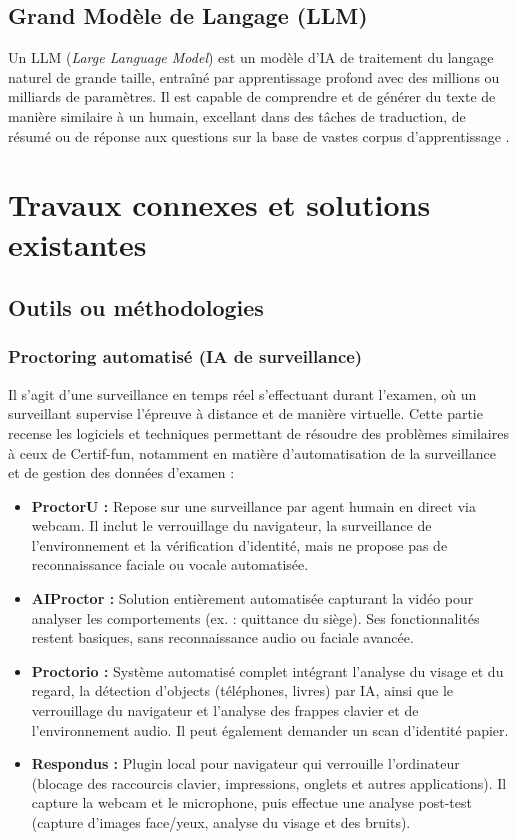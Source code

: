 \subsection{Grand Modèle de Langage (LLM)}
Un LLM (\textit{Large Language Model}) est un modèle d’IA de traitement du langage naturel de grande taille, entraîné par apprentissage profond avec des millions ou milliards de paramètres. Il est capable de comprendre et de générer du texte de manière similaire à un humain, excellant dans des tâches de traduction, de résumé ou de réponse aux questions sur la base de vastes corpus d'apprentissage \cite{topakkaya2024llm}.

\section{Travaux connexes et solutions existantes}
\subsection{Outils ou méthodologies}

\subsubsection{Proctoring automatisé (IA de surveillance)}
Il s'agit d'une surveillance en temps réel s'effectuant durant l'examen, où un surveillant supervise l'épreuve à distance et de manière virtuelle. Cette partie recense les logiciels et techniques permettant de résoudre des problèmes similaires à ceux de Certif-fun, notamment en matière d’automatisation de la surveillance et de gestion des données d’examen \cite{hussein2020evaluation} :

\begin{itemize}
    \item \textbf{ProctorU :} Repose sur une surveillance par agent humain en direct via webcam. Il inclut le verrouillage du navigateur, la surveillance de l’environnement et la vérification d’identité, mais ne propose pas de reconnaissance faciale ou vocale automatisée.
    \item \textbf{AIProctor :} Solution entièrement automatisée capturant la vidéo pour analyser les comportements (ex. : quittance du siège). Ses fonctionnalités restent basiques, sans reconnaissance audio ou faciale avancée.
    \item \textbf{Proctorio :} Système automatisé complet intégrant l’analyse du visage et du regard, la détection d’objects (téléphones, livres) par IA, ainsi que le verrouillage du navigateur et l’analyse des frappes clavier et de l’environnement audio. Il peut également demander un scan d'identité papier.
    \item \textbf{Respondus :} Plugin local pour navigateur qui verrouille l'ordinateur (blocage des raccourcis clavier, impressions, onglets et autres applications). Il capture la webcam et le microphone, puis effectue une analyse post-test (capture d’images face/yeux, analyse du visage et des bruits).
\end{itemize}

